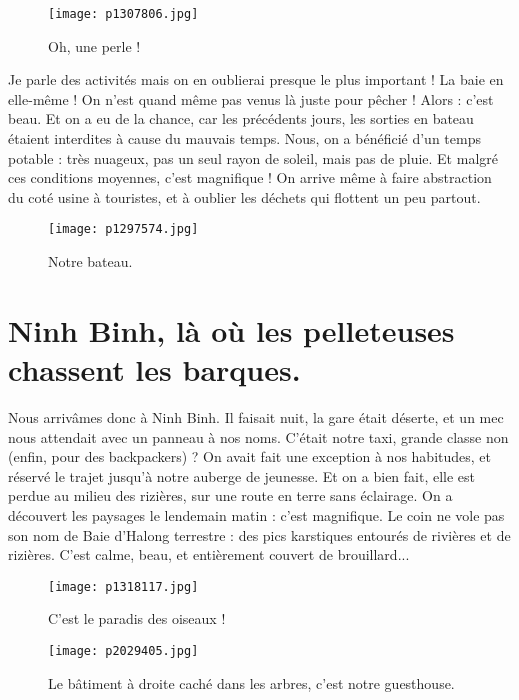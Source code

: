\documentclass{book}
\begin{document}
\begin{figure}[h]
\centering
\texttt{[image: p1307806.jpg]}
\caption*{Oh, une perle !}
\end{figure}

Je parle des activités mais on en oublierai presque le plus important ! La baie en elle-même ! On n'est quand même pas venus là juste pour pêcher ! Alors : c'est beau. Et on a eu de la chance, car les précédents jours, les sorties en bateau étaient interdites à cause du mauvais temps. Nous, on a bénéficié d'un temps potable : très nuageux, pas un seul rayon de soleil, mais pas de pluie. Et malgré ces conditions moyennes, c'est magnifique ! On arrive même à faire abstraction du coté usine à touristes, et à oublier les déchets qui flottent un peu partout.


\begin{figure}[h]
\centering
\texttt{[image: p1297574.jpg]}
\caption*{Notre bateau.}
\end{figure}

\chapter{Ninh Binh, là où les pelleteuses chassent les barques.}
Nous arrivâmes donc à Ninh Binh. Il faisait nuit, la gare était déserte, et un mec nous attendait avec un panneau à nos noms. C'était notre taxi, grande classe non (enfin, pour des backpackers) ? On avait fait une exception à nos habitudes, et réservé le trajet jusqu'à notre auberge de jeunesse. Et on a bien fait, elle est perdue au milieu des rizières, sur une route en terre sans éclairage. On a découvert les paysages le lendemain matin : c'est magnifique. Le coin ne vole pas son nom de Baie d'Halong terrestre : des pics karstiques entourés de rivières et de rizières. C'est calme, beau, et entièrement couvert de brouillard...


\begin{figure}[h]
\centering
\texttt{[image: p1318117.jpg]}
\caption*{C'est le paradis des oiseaux !}
\end{figure}




\begin{figure}[h]
\centering
\texttt{[image: p2029405.jpg]}
\caption*{Le bâtiment à droite caché dans les arbres, c'est notre guesthouse.}
\end{figure}
\end{document}

